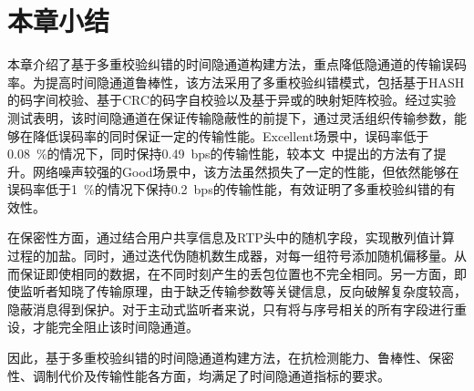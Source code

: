 \section{本章小结}
\label{chap:hash:summary}

本章介绍了基于多重校验纠错的时间隐通道构建方法，重点降低隐通道的传输误码率。为提高时间隐通道鲁棒性，该方法采用了多重校验纠错模式，包括基于HASH的码字间校验、基于CRC的码字自校验以及基于异或的映射矩阵校验。经过实验测试表明，该时间隐通道在保证传输隐蔽性的前提下，通过灵活组织传输参数，能够在降低误码率的同时保证一定的传输性能。Excellent场景中，误码率低于{0.08\ \%}的情况下，同时保持{0.49\ bps}的传输性能，较本文\ 中提出的方法有了提升。网络噪声较强的Good场景中，该方法虽然损失了一定的性能，但依然能够在误码率低于{1\ \%}的情况下保持{0.2\ bps}的传输性能，有效证明了多重校验纠错的有效性。

在保密性方面，通过结合用户共享信息及RTP头中的随机字段，实现散列值计算过程的加盐。同时，通过迭代伪随机数生成器，对每一组符号添加随机偏移量。从而保证即使相同的数据，在不同时刻产生的丢包位置也不完全相同。另一方面，即使监听者知晓了传输原理，由于缺乏传输参数等关键信息，反向破解复杂度较高，隐蔽消息得到保护。对于主动式监听者来说，只有将与序号相关的所有字段进行重设，才能完全阻止该时间隐通道。

因此，基于多重校验纠错的时间隐通道构建方法，在抗检测能力、鲁棒性、保密性、调制代价及传输性能各方面，均满足了时间隐通道指标的要求。